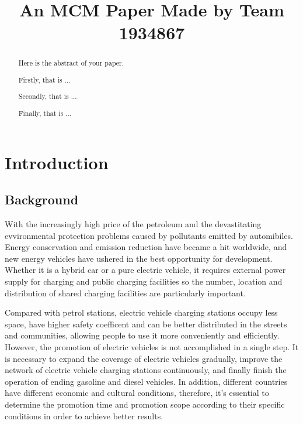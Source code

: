 \documentclass[12pt]{article}  %
\title{An MCM Paper Made by Team 1934867}  %
\begin{document}
\begin{abstract}
    Here is the abstract of your paper.

    Firstly, that is ...

    Secondly, that is ...

    Finally, that is ...


\end{abstract}

\maketitle  %
\tableofcontents  %


\section{Introduction}
\subsection{Background}
With the increasingly high price of the petroleum and the devastitating evvironmental protection problems caused by pollutants emitted by automibiles. Energy conservation and emission reduction have became a hit worldwide, and new energy vehicles have ushered in the best opportunity for development. Whether it is a hybrid car or a pure electric vehicle, it requires external power supply for charging and public charging facilities so the number, location and distribution of shared charging facilities are particularly important. 

Compared with petrol stations, electric vehicle charging stations occupy less space, have higher safety coefficent and can be better distributed in the streets and communities, allowing people to use it more conveniently and efficiently. However, the promotion of electric vehicles is not accomplished in a single step. It is necessary to expand the coverage of electric vehicles gradually, improve the network of electric vehicle charging stations continuously, and finally finish the operation of ending gasoline and diesel vehicles. In addition, different countries have different economic and cultural conditions, therefore, it's essential to determine the promotion time and promotion scope according to their specific conditions in order to achieve better results.
\end{document}
